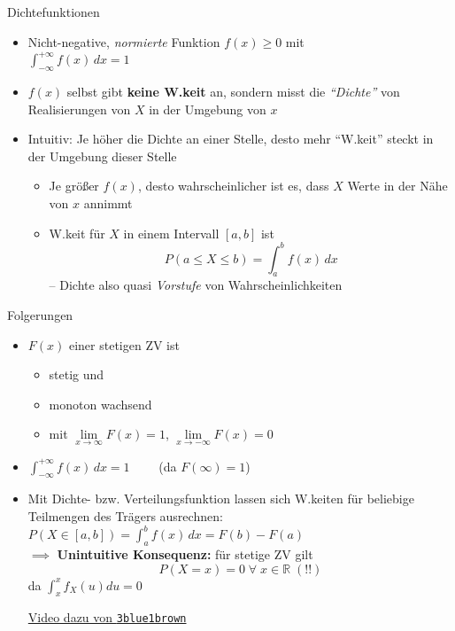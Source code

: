 \documentclass[
  10pt,
  ignorenonframetext,
]{beamer}
\providecommand{\tightlist}{%
  \setlength{\itemsep}{0pt}\setlength{\parskip}{0pt}}
\begin{document}
\begin{frame}{Dichtefunktionen}
\protect\hypertarget{dichtefunktionen}{}
\begin{itemize}
\tightlist
\item
  Nicht-negative, \emph{normierte} Funktion \(f(x) \geq 0\) mit\\
  \(\int_{-\infty}^{+\infty} f(x)\,dx = 1\)
\item
  \(f(x)\) selbst gibt \textbf{keine W.keit} an, sondern misst die
  \emph{``Dichte''} von Realisierungen von \(X\) in der Umgebung von
  \(x\)
\item
  Intuitiv: Je höher die Dichte an einer Stelle, desto mehr ``W.keit''
  steckt in der Umgebung dieser Stelle

  \begin{itemize}
  \tightlist
  \item
    Je größer \(f(x)\), desto wahrscheinlicher ist es, dass \(X\) Werte
    in der Nähe von \(x\) annimmt
  \item
    W.keit für \(X\) in einem Intervall \([a,b]\) ist
    \[P(a \leq X \leq b) = \int_a^b f(x)\,dx\] -- Dichte also quasi
    \emph{Vorstufe} von Wahrscheinlichkeiten
  \end{itemize}
\end{itemize}
\end{frame}

\begin{frame}[fragile]{Folgerungen}
\protect\hypertarget{folgerungen-2}{}
\begin{itemize}
\item
  \(F(x)\) einer stetigen ZV ist

  \begin{itemize}
  \tightlist
  \item
    stetig und
  \item
    monoton wachsend
  \item
    mit \(\lim\limits_{x \to \infty} F(x) = 1\),
    \(\lim\limits_{x \to -\infty} F(x) = 0\)
  \end{itemize}
\item
  \(\int_{-\infty}^{+\infty} f(x)\,dx = 1 \qquad\) (da
  \(F(\infty) = 1\))
\item
  Mit Dichte- bzw. Verteilungsfunktion lassen sich W.keiten für
  beliebige Teilmengen des Trägers ausrechnen:\\
  \(P(X \in [a, b]) = \int_a^b f(x)\,dx = F(b) - F(a)\)\\
  \(\implies\) \textbf{Unintuitive Konsequenz:} für stetige ZV gilt
  \[P(X = x) = 0 \; \forall \; x \in \mathbb{R} \;(!!)\] da
  \(\int^x_x f_X(u)du = 0\)

  \scriptsize \href{https://youtu.be/ZA4JkHKZM50}{Video dazu von
  \texttt{3blue1brown}}
\end{itemize}
\end{frame}
\end{document}
